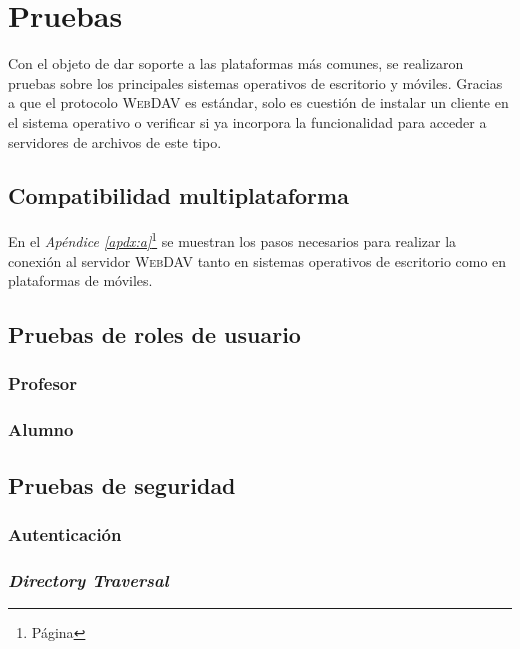 {
  \linespread{1}
  \cleardoublepage  
  \chapter{Pruebas}
  \label{chap:cap4}
}

Con el objeto de dar soporte a las plataformas m\'{a}s comunes, se realizaron pruebas sobre los principales sistemas operativos de escritorio y m\'{o}viles. Gracias a que el protocolo \textsc{WebDAV} es est\'{a}ndar, solo es cuesti\'{o}n de instalar un cliente en el sistema operativo o verificar si ya incorpora la funcionalidad para acceder a servidores de archivos de este tipo.

    \section {Compatibilidad multiplataforma}

En el \textsl{Ap\'{e}ndice \ref{apdx:a}}\footnote{P\'{a}gina \pageref{apdx:a}} se muestran los pasos necesarios para realizar la conexi\'{o}n al servidor \textsc{WebDAV} tanto en sistemas operativos de escritorio como en plataformas de m\'{o}viles.

    \section {Pruebas de roles de usuario}
      \subsection {Profesor}
      \subsection {Alumno}
    \section {Pruebas de seguridad}
      \subsection {Autenticaci\'{o}n}
      \subsection {\textit{Directory Traversal}}


